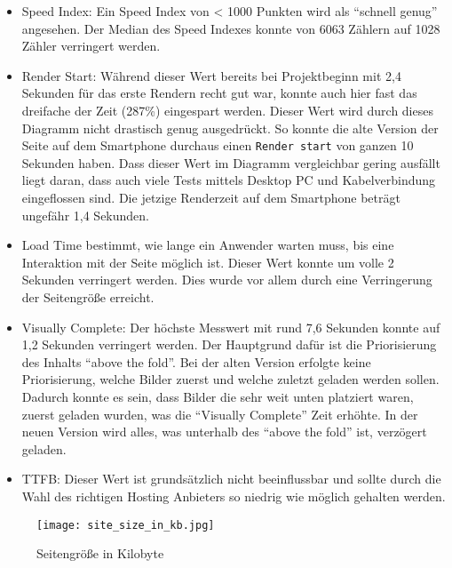     \begin{itemize}
        \item Speed Index: Ein Speed Index von < 1000 Punkten wird als "`schnell genug"' angesehen. Der Median des Speed Indexes konnte von 6063 Zählern auf 1028 Zähler verringert werden.

        \item Render Start: Während dieser Wert bereits bei Projektbeginn mit 2,4 Sekunden für das erste Rendern recht gut war, konnte auch hier fast das dreifache der Zeit (287\%) eingespart werden. Dieser Wert wird durch dieses Diagramm nicht drastisch genug ausgedrückt. So konnte die alte Version der Seite auf dem Smartphone durchaus einen \texttt{Render start} von ganzen 10 Sekunden haben. Dass dieser Wert im Diagramm vergleichbar gering ausfällt liegt daran, dass auch viele Tests mittels Desktop PC und Kabelverbindung eingeflossen sind. Die jetzige Renderzeit auf dem Smartphone beträgt ungefähr 1,4 Sekunden.

        \item Load Time bestimmt, wie lange ein Anwender warten muss, bis eine Interaktion mit der Seite möglich ist. Dieser Wert konnte um volle 2 Sekunden verringert werden. Dies wurde vor allem durch eine Verringerung der Seitengröße erreicht.

        \item Visually Complete: Der höchste Messwert mit rund 7,6 Sekunden konnte auf 1,2 Sekunden verringert werden. Der Hauptgrund dafür ist die Priorisierung des Inhalts "`above the fold"'. Bei der alten Version erfolgte keine Priorisierung, welche Bilder zuerst und welche zuletzt geladen werden sollen. Dadurch konnte es sein, dass Bilder die sehr weit unten platziert waren, zuerst geladen wurden, was die "`Visually Complete"' Zeit erhöhte. In der neuen Version wird alles, was unterhalb des "`above the fold"' ist, verzögert geladen.

        \item TTFB: Dieser Wert ist grundsätzlich nicht beeinflussbar und sollte durch die Wahl des richtigen Hosting Anbieters so niedrig wie möglich gehalten werden.
    \end{itemize}

    \pagebreak

		\begin{figure}[htbp]
			\begin{center}
				\texttt{[image: site\_size\_in\_kb.jpg]}
				\caption{Seitengröße in Kilobyte}
				\label{fig:site_size_in_kb}
			\end{center}
		\end{figure}

